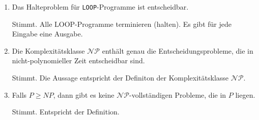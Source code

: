 \documentclass{bschlangaul-aufgabe}
\begin{document}
\begin{enumerate}

\item Das Halteproblem für \texttt{LOOP}-Programme ist entscheidbar.

\begin{bAntwort}
Stimmt. Alle LOOP-Programme terminieren (halten). Es gibt für
jede Eingabe eine Ausgabe.
\end{bAntwort}


\item Die Komplexitätsklasse $\mathcal{NP}$ enthält genau die
Entscheidungsprobleme, die in nicht-polynomieller Zeit entscheidbar
sind.

\begin{bAntwort}
Stimmt. Die Aussage entspricht der Definiton der Komplexitätsklasse
$\mathcal{NP}$.
\end{bAntwort}


\item Falls $P \geq NP$, dann gibt es keine $\mathcal{NP}$-vollständigen
Probleme, die in $P$ liegen.

\begin{bAntwort}
Stimmt. Entspricht der Definition.
\end{bAntwort}
\end{enumerate}
\end{document}
